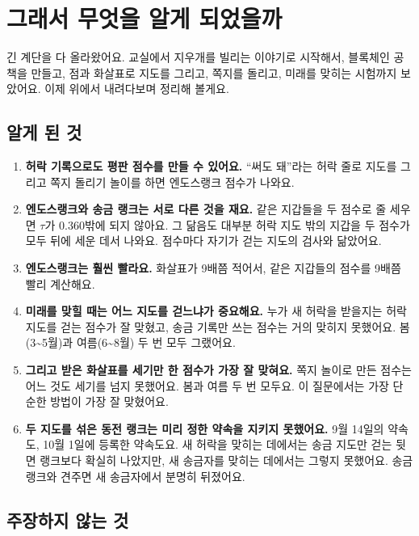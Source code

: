 \chapter{그래서 무엇을 알게 되었을까}

긴 계단을 다 올라왔어요.
교실에서 지우개를 빌리는 이야기로 시작해서, 블록체인 공책을 만들고,
점과 화살표로 지도를 그리고, 쪽지를 돌리고, 미래를 맞히는 시험까지 보았어요.
이제 위에서 내려다보며 정리해 볼게요.

\section{알게 된 것}

\begin{enumerate}
\item \textbf{허락 기록으로도 평판 점수를 만들 수 있어요.}
      “써도 돼”라는 허락 줄로 지도를 그리고 쪽지 돌리기 놀이를 하면 엔도스랭크 점수가 나와요.
\item \textbf{엔도스랭크와 송금 랭크는 서로 다른 것을 재요.}
      같은 지갑들을 두 점수로 줄 세우면 $\tau$가 0.360밖에 되지 않아요.
      그 닮음도 대부분 허락 지도 밖의 지갑을 두 점수가 모두 뒤에 세운 데서 나와요.
      점수마다 자기가 걷는 지도의 검사와 닮았어요.
\item \textbf{엔도스랭크는 훨씬 빨라요.}
      화살표가 9배쯤 적어서, 같은 지갑들의 점수를 9배쯤 빨리 계산해요.
\item \textbf{미래를 맞힐 때는 어느 지도를 걷느냐가 중요해요.}
      누가 새 허락을 받을지는 허락 지도를 걷는 점수가 잘 맞혔고, 송금 기록만 쓰는 점수는 거의 맞히지 못했어요.
      봄(3\textasciitilde{}5월)과 여름(6\textasciitilde{}8월) 두 번 모두 그랬어요.
\item \textbf{그리고 받은 화살표를 세기만 한 점수가 가장 잘 맞혀요.}
      쪽지 놀이로 만든 점수는 어느 것도 세기를 넘지 못했어요. 봄과 여름 두 번 모두요.
      이 질문에서는 가장 단순한 방법이 가장 잘 맞혔어요.
\item \textbf{두 지도를 섞은 동전 랭크는 미리 정한 약속을 지키지 못했어요.}
      9월 14일의 약속도, 10월 1일에 등록한 약속도요.
      새 허락을 맞히는 데에서는 송금 지도만 걷는 뒷면 랭크보다 확실히 나았지만, 새 송금자를 맞히는 데에서는 그렇지 못했어요.
      송금 랭크와 견주면 새 송금자에서 분명히 뒤졌어요.
\end{enumerate}

\section{주장하지 않는 것}

